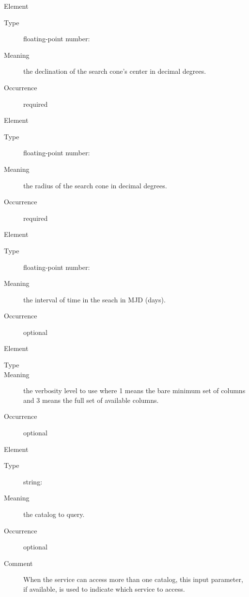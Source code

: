 \documentclass[11pt,a4paper]{ivoa}
\begin{document}
\begin{generated}
\begin{bigdescription}
	\item[Element \xmlel{dec}]
	\begin{description}
		\item[Type] floating-point number:  
		\item[Meaning] the declination of the search cone's center in decimal degrees.  
		\item[Occurrence] required
	\end{description} 

	\item[Element \xmlel{sr}]
	\begin{description}
		\item[Type] floating-point number:  
		\item[Meaning] the radius of the search cone in decimal degrees.
    \item[Occurrence] required
	\end{description}

	\item[Element \xmlel{time}]
	\begin{description}
		\item[Type] floating-point number:  
		\item[Meaning] the interval of time in the seach in MJD (days).
		\item[Occurrence] optional
	\end{description}

	\item[Element \xmlel{verb}]
	\begin{description}
		\item[Type] 
		\item[Meaning] the verbosity level to use where 1 means the bare 
minimum set of columns and 3 means the full set of available columns.
		\item[Occurrence] optional 
	\end{description}

	\item[Element \xmlel{catalog}]
	\begin{description}
		\item[Type] string:  
		\item[Meaning] the catalog to query.  
		\item[Occurrence] optional 
		\item[Comment] When the service can access more than one catalog, 
this input parameter, if available, is used to indicate which service to access.
	\end{description}
	

\end{bigdescription}
\end{generated}
\end{document}
